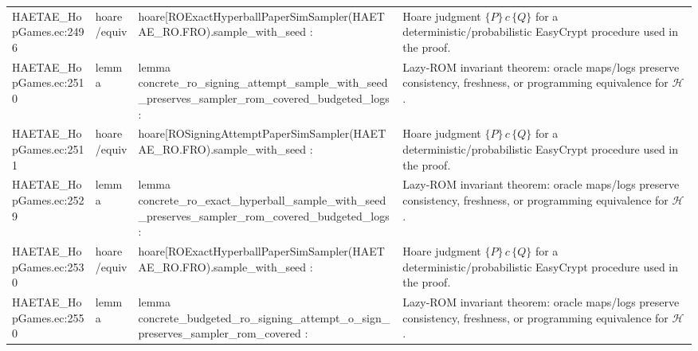 \documentclass[10pt]{article}
\begin{document}
\begin{longtable}{L{0.11\textwidth}L{0.055\textwidth}L{0.385\textwidth}L{0.41\textwidth}}
HAETAE\_\allowbreak{}HopGames.\allowbreak{}ec:\allowbreak{}2496 & hoare/equiv & {\ttfamily\scriptsize hoare[ROExactHyperballPaperSimSampler(HAETAE\_\allowbreak{}RO.FRO).sample\_\allowbreak{}with\_\allowbreak{}seed :} & Hoare judgment $\{P\}\,c\,\{Q\}$ for a deterministic/probabilistic EasyCrypt procedure used in the proof. \\
HAETAE\_\allowbreak{}HopGames.\allowbreak{}ec:\allowbreak{}2510 & lemma & {\ttfamily\scriptsize lemma concrete\_\allowbreak{}ro\_\allowbreak{}signing\_\allowbreak{}attempt\_\allowbreak{}sample\_\allowbreak{}with\_\allowbreak{}seed\_\allowbreak{}preserves\_\allowbreak{}sampler\_\allowbreak{}rom\_\allowbreak{}covered\_\allowbreak{}budgeted\_\allowbreak{}logs :} & Lazy-ROM invariant theorem: oracle maps/logs preserve consistency, freshness, or programming equivalence for $\mathcal H$. \\
HAETAE\_\allowbreak{}HopGames.\allowbreak{}ec:\allowbreak{}2511 & hoare/equiv & {\ttfamily\scriptsize hoare[ROSigningAttemptPaperSimSampler(HAETAE\_\allowbreak{}RO.FRO).sample\_\allowbreak{}with\_\allowbreak{}seed :} & Hoare judgment $\{P\}\,c\,\{Q\}$ for a deterministic/probabilistic EasyCrypt procedure used in the proof. \\
HAETAE\_\allowbreak{}HopGames.\allowbreak{}ec:\allowbreak{}2529 & lemma & {\ttfamily\scriptsize lemma concrete\_\allowbreak{}ro\_\allowbreak{}exact\_\allowbreak{}hyperball\_\allowbreak{}sample\_\allowbreak{}with\_\allowbreak{}seed\_\allowbreak{}preserves\_\allowbreak{}sampler\_\allowbreak{}rom\_\allowbreak{}covered\_\allowbreak{}budgeted\_\allowbreak{}logs :} & Lazy-ROM invariant theorem: oracle maps/logs preserve consistency, freshness, or programming equivalence for $\mathcal H$. \\
HAETAE\_\allowbreak{}HopGames.\allowbreak{}ec:\allowbreak{}2530 & hoare/equiv & {\ttfamily\scriptsize hoare[ROExactHyperballPaperSimSampler(HAETAE\_\allowbreak{}RO.FRO).sample\_\allowbreak{}with\_\allowbreak{}seed :} & Hoare judgment $\{P\}\,c\,\{Q\}$ for a deterministic/probabilistic EasyCrypt procedure used in the proof. \\
HAETAE\_\allowbreak{}HopGames.\allowbreak{}ec:\allowbreak{}2550 & lemma & {\ttfamily\scriptsize lemma concrete\_\allowbreak{}budgeted\_\allowbreak{}ro\_\allowbreak{}signing\_\allowbreak{}attempt\_\allowbreak{}o\_\allowbreak{}sign\_\allowbreak{}preserves\_\allowbreak{}sampler\_\allowbreak{}rom\_\allowbreak{}covered :} & Lazy-ROM invariant theorem: oracle maps/logs preserve consistency, freshness, or programming equivalence for $\mathcal H$. \\

\end{longtable}
\end{document}

